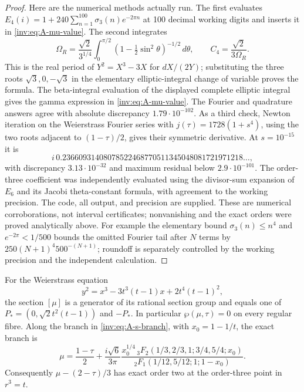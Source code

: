 \begin{proof}
Here are the numerical methods actually run.  The first evaluates
$E_4(i)=1+240\sum_{n=1}^{100}\sigma_3(n)e^{-2\pi n}$ at 100
decimal working digits and inserts it in \eqref{inv:eq:A-mu-value}.
The second integrates
\[
\Omega_R=\frac{\sqrt2}{3^{1/4}}
\int_0^{\pi/2}(1-\tfrac12\sin^2\theta)^{-1/2}\,d\theta,
\qquad C_4=\frac{\sqrt2}{3\Omega_R}.
\]
This is the real period of $Y^2=X^3-3X$ for $dX/(2Y)$; substituting
the three roots $\sqrt3,0,-\sqrt3$ in the elementary elliptic-integral
change of variable proves the formula.  The beta-integral evaluation
of the displayed complete elliptic integral gives the gamma
expression in \eqref{inv:eq:A-mu-value}.  The Fourier and quadrature
answers agree with absolute discrepancy $1.79\cdot10^{-102}$.
As a third check, Newton iteration on the Weierstrass Fourier series
with $j(\tau)=1728(1+s^4)$, using the two roots adjacent to
$(1-\tau)/2$, gives their symmetric derivative.  At $s=10^{-15}$ it
is
\[
i\,0.23660931408078522468770511345048081721971218\ldots,
\]
with discrepancy $3.13\cdot10^{-32}$ and maximum residual below
$2.9\cdot10^{-101}$.  The order-three coefficient was independently
evaluated using the divisor-sum expansion of $E_6$ and its Jacobi
theta-constant formula, with agreement to the working precision.
The code, all output, and precision are supplied.  These are numerical
corroborations, not interval certificates; nonvanishing and the exact
orders were proved analytically above.  For example the elementary
bound $\sigma_3(n)\le n^4$ and $e^{-2\pi}<1/500$ bounds the omitted
Fourier tail after $N$ terms by
$250(N+1)^4 500^{-(N+1)}$; roundoff is separately controlled by
the working precision and the independent calculation.
\end{proof}

\begin{proposition}\label{inv:A2.3}
For the Weierstrass equation
\[
y^2=x^3-3t^3(t-1)x+2t^4(t-1)^2,
\]
the section $[\mu]$ is a generator of its rational section group and
equals one of $P_*=(0,\sqrt2t^2(t-1))$ and $-P_*$.
In particular $\wp(\mu,\tau)=0$ on every regular fibre.
Along the branch in \eqref{inv:eq:A-s-branch}, with
$x_0=1-1/t$, the exact branch is
\begin{equation}\label{inv:eq:A-DI-branch}
\mu=\frac{1-\tau}{2}
 +\frac{i\sqrt6}{3\pi}
 \frac{x_0^{1/4}\,{}_3F_2(1/3,2/3,1;3/4,5/4;x_0)}
 {{}_2F_1(1/12,5/12;1;1-x_0)}.
\end{equation}
Consequently $\mu-(2-\tau)/3$ has exact order two at the
order-three point in $r^3=t$.
\end{proposition}

